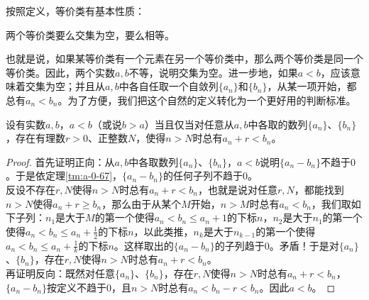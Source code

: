 \documentclass[12pt,UTF8]{ctexbook}
\begin{document}
\begin{appendix}
按照定义，等价类有基本性质：
\begin{tm}\label{lm:a-1-10}
    两个等价类要么交集为空，要么相等。    
\end{tm}
也就是说，如果某等价类有一个元素在另一个等价类中，那么两个等价类是同一个等价类。因此，两个实数$a,b$不等，说明交集为空。进一步地，如果$a<b$，应该意味着交集为空；并且从$a,b$中各自任取一个自敛列$\{a_n\}$和$\{b_n\}$，从某一项开始，都总有$a_n < b_n$。为了方便，我们把这个自然的定义转化为一个更好用的判断标准。
\begin{tm}\label{tm:a-1-12}
    设有实数$a,b$，$a<b$（或说$b>a$）当且仅当对任意从$a,b$中各取的数列$\{a_n\}$、$\{b_n\}$，存在有理数$r>0$、正整数$N$，使得$n>N$时总有$a_n+r<b_n$。
\end{tm}
\begin{proof}
    首先证明正向：从$a,b$中各取数列$\{a_n\}$、$\{b_n\}$，$a<b$说明$\{a_n - b_n\}$不趋于$0$。于是依定理\ref{tm:a-0-67}，$\{a_n - b_n\}$的任何子列不趋于$0$。\\
    反设不存在$r,N$使得$n>N$时总有$a_n+r<b_n$，也就是说对任意$r,N$，都能找到$n>N$使得$a_n+r\geqslant b_n$，那么由于从某个$M$开始，$n>M$时总有$a_n < b_n$，我们取如下子列：$n_1$是大于$M$的第一个使得$a_n<b_n\leqslant a_n+1$的下标$n$，$n_2$是大于$n_1$的第一个使得$a_n<b_n\leqslant a_n+\frac{1}{2}$的下标$n$，以此类推，$n_k$是大于$n_{k-1}$的第一个使得$a_n<b_n\leqslant a_n+\frac{1}{k}$的下标$n$。这样取出的$\{a_n - b_n\}$的子列趋于$0$。矛盾！于是对$\{a_n\}$、$\{b_n\}$，存在$r,N$使得$n>N$时总有$a_n+r<b_n$。\\
    再证明反向：既然对任意$\{a_n\}$、$\{b_n\}$，存在$r,N$使得$n>N$时总有$a_n+r<b_n$，$\{a_n - b_n\}$按定义不趋于$0$，且$n>N$时总有$a_n<b_n-r<b_n$。因此$a<b$。
\end{proof}


\end{appendix}
\end{document}
